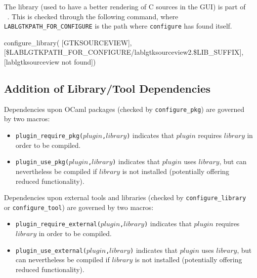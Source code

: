 \begin{example}
  The library \lablgtksourceview{} (used to have a
  better rendering of C sources in the GUI) is part of
  \lablgtk{}~\cite{lablgtk}.
  This is checked through the following command,
  where \texttt{LABLGTKPATH\_FOR\_CONFIGURE} is the path where
  \texttt{configure} has found \lablgtk itself.

\begin{configurecode}
configure_library(
  [GTKSOURCEVIEW],
  [\$LABLGTKPATH_FOR_CONFIGURE/lablgtksourceview2.\$LIB_SUFFIX],
  [lablgtksourceview not found])
\end{configurecode}
\end{example}

\subsection{Addition of Library/Tool Dependencies}\label{conf:dep-lib}

Dependencies upon OCaml packages (checked by \texttt{configure\_pkg}) are
governed by two macros:

\begin{itemize}
\item \texttt{plugin\_require\_pkg($plugin$,$library$)}%
 indicates that
$plugin$ requires $library$ in order to be compiled.
\item \texttt{plugin\_use\_pkg($plugin$,$library$)}%
 indicates that
$plugin$ uses $library$, but can nevertheless be compiled if $library$
is not installed (potentially offering reduced functionality).
\end{itemize}

Dependencies upon external tools and libraries (checked by
\texttt{configure\_library} or \texttt{configure\_tool})
are governed by two macros:
\begin{itemize}
\item \texttt{plugin\_require\_external($plugin$,$library$)}%
 indicates that
$plugin$ requires $library$ in order to be compiled.
\item \texttt{plugin\_use\_external($plugin$,$library$)}%
 indicates that
$plugin$ uses $library$, but can nevertheless be compiled if $library$
is not installed (potentially offering reduced functionality).
\end{itemize}

